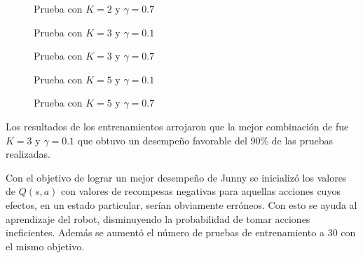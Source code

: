 \begin{figure}[h]
\caption{Prueba  con $K = 2$ y $ \gamma = 0.7 $}
\label{fig:k2y7}
\end{figure} 

\begin{figure}[h]
\caption{Prueba con $K = 3$ y $ \gamma = 0.1 $}
\label{fig:k3y1}
\end{figure} 

\begin{figure}[h]
\caption{Prueba con $K = 3$ y $ \gamma = 0.7 $}
\label{fig:k3y7}
\end{figure} 

\begin{figure}[h]
\caption{Prueba con $K = 5$ y $ \gamma = 0.1 $}
\label{fig:k5y1}
\end{figure} 

\begin{figure}[h]
\caption{Prueba con $K = 5$ y $ \gamma = 0.7 $}
\label{fig:k5y7}
\end{figure} 

Los resultados de los entrenamientos arrojaron que la mejor combinaci\'on de fue $K = 3$ y $ \gamma = 0.1 $ que obtuvo un desempeño favorable del 90\% de las pruebas realizadas.

Con el objetivo de lograr un mejor desempeño de Junny se inicializ\'o los valores de $Q(s,a)$ con valores de recompesas negativas para aquellas acciones cuyos efectos, en un estado particular, serían obviamente err\'oneos. Con esto se ayuda al aprendizaje del robot, disminuyendo la probabilidad de tomar acciones ineficientes. Adem\'as se aumentó el n\'umero de pruebas de entrenamiento a 30 con el mismo objetivo.

